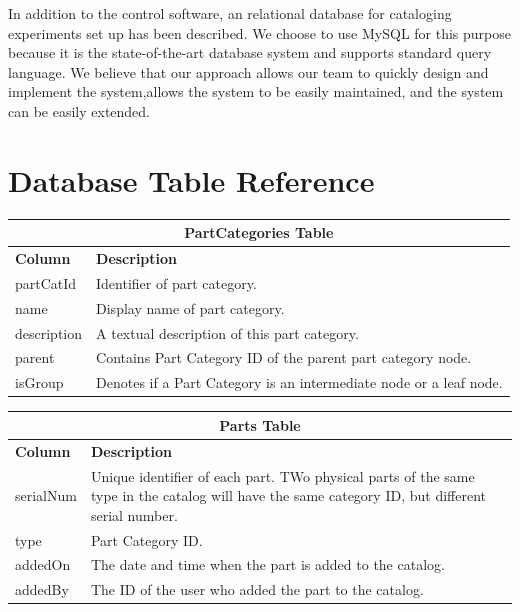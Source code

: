 In addition to the control software, an relational database for cataloging experiments set up has been described. We choose to use MySQL for this purpose because it is the state-of-the-art database system and supports standard query language. We believe that our approach allows our team to quickly design and implement the system,allows the system to be easily maintained, and the system can be easily extended.

\section{Database Table Reference}

\begin{table}[h!]
\centering
\begin{tabular}{l p{12cm}}
\multicolumn{2}{c}{\bf PartCategories Table} \\ \hline
{\bf Column} & {\bf Description}\\ \hline
partCatId & Identifier of part category.\\ \hline
name & Display name of part category.\\ \hline
description & A textual description of this part category. \\ \hline
parent & Contains Part Category ID of the parent part category node.\\ \hline
isGroup & Denotes if a Part Category is an intermediate node or a leaf node. \\ \hline
\end{tabular}
\end{table}

\begin{table}[h!]
\centering
\begin{tabular}{l p{12cm}}
\multicolumn{2}{c}{\bf Parts Table} \\ \hline
{\bf Column} & {\bf Description}\\ \hline
serialNum & Unique identifier of each part. TWo physical parts of the same type in the catalog will have the same category ID, but different serial number.\\ \hline
type & Part Category ID.\\ \hline
addedOn & The date and time when the part is added to the catalog. \\ \hline
addedBy & The ID of the user who added the part to the catalog.\\ \hline
\end{tabular}
\end{table}

